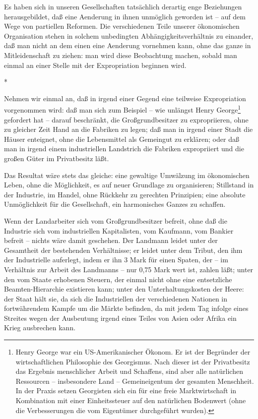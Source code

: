 \documentclass{scrbook}
\begin{document}
Es haben sich in unseren Gesellschaften tatsächlich derartig enge Beziehungen herausgebildet, daß eine Aenderung in ihnen unmöglich geworden ist – auf dem Wege von partiellen Reformen. Die verschiedenen Teile unserer ökonomischen Organisation stehen in solchem unbedingten Abhängigkeitsverhältnis zu einander, daß man nicht an dem einen eine Aenderung vornehmen kann, ohne das ganze in Mitleidenschaft zu ziehen: man wird diese Beobachtung machen, sobald man einmal an einer Stelle mit der Expropriation beginnen wird.

\begin{center}*\end{center}

Nehmen wir einmal an, daß in irgend einer Gegend eine teilweise Expropriation vorgenommen wird: daß man sich zum Beispiel – wie unlängst Henry George\footnote{Henry George war ein US-Amerikanischer Ökonom. Er ist der Begründer der wirtschaftlichen Philosophie des Georgismus. Nach dieser ist der Privatbesitz das Ergebnis menschlicher Arbeit und Schaffens, sind aber alle natürlichen Ressourcen – insbesondere Land – Gemeineigentum der gesamten Menschheit. In der Praxis setzen Georgisten sich ein für eine freie Marktwirtschaft in Kombination mit einer Einheitssteuer auf den natürlichen Bodenwert (ohne die Verbesserungen die vom Eigentümer durchgeführt wurden).} gefordert hat – darauf beschränkt, die Großgrundbesitzer zu expropriieren, ohne zu gleicher Zeit Hand an die Fabriken zu legen; daß man in irgend einer Stadt die Häuser enteignet, ohne die Lebensmittel als Gemeingut zu erklären; oder daß man in irgend einem industriellen Landstrich die Fabriken expropriiert und die großen Güter im Privatbesitz läßt.

Das Resultat wäre stets das gleiche: eine gewaltige Umwälzung im ökonomischen Leben, ohne die Möglichkeit, es auf neuer Grundlage zu organisieren; Stillstand in der Industrie, im Handel, ohne Rückkehr zu gerechten Prinzipien; eine absolute Unmöglichkeit für die Gesellschaft, ein harmonisches Ganzes zu schaffen.

Wenn der Landarbeiter sich vom Großgrundbesitzer befreit, ohne daß die Industrie sich vom industriellen Kapitalisten, vom Kaufmann, vom Bankier befreit – nichts wäre damit geschehen. Der Landmann leidet unter der Gesamtheit der bestehenden Verhältnisse; er leidet unter dem Tribut, den ihm der Industrielle auferlegt, indem er ihn 3 Mark für einen Spaten, der – im Verhältnis zur Arbeit des Landmanns – nur 0,75 Mark wert ist, zahlen läßt; unter den vom Staate erhobenen Steuern, der einmal nicht ohne eine entsetzliche Beamten-Hierarchie existieren kann; unter den Unterhaltungskosten der Heere: der Staat hält sie, da sich die Industriellen der verschiedenen Nationen in fortwährendem Kampfe um die Märkte befinden, da mit jedem Tag infolge eines Streites wegen der Ausbeutung irgend eines Teiles von Asien oder Afrika ein Krieg ausbrechen kann.
\end{document}
